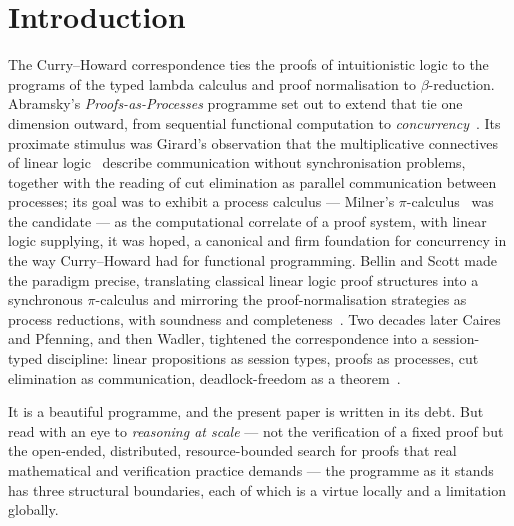 \documentclass[11pt]{article}
\theoremstyle{definition}
\theoremstyle{plain}
\begin{document}
\section{Introduction}

The Curry--Howard correspondence ties the proofs of intuitionistic logic to the
programs of the typed lambda calculus and proof normalisation to
$\beta$-reduction. Abramsky's \emph{Proofs-as-Processes} programme set out to
extend that tie one dimension outward, from sequential functional computation to
\emph{concurrency}~\cite{Abramsky93,Abramsky94}. Its proximate stimulus was
Girard's observation that the multiplicative connectives of linear
logic~\cite{Girard87} describe communication without synchronisation problems,
together with the reading of cut elimination as parallel communication between
processes; its goal was to exhibit a process calculus --- Milner's
$\pi$-calculus~\cite{MPW92} was the candidate --- as the computational correlate
of a proof system, with linear logic supplying, it was hoped, a canonical and
firm foundation for concurrency in the way Curry--Howard had for functional
programming. Bellin and Scott made the paradigm precise, translating classical
linear logic proof structures into a synchronous $\pi$-calculus and mirroring
the proof-normalisation strategies as process reductions, with soundness and
completeness~\cite{BellinScott94}. Two decades later Caires and Pfenning, and
then Wadler, tightened the correspondence into a session-typed discipline:
linear propositions as session types, proofs as processes, cut elimination as
communication, deadlock-freedom as a theorem~\cite{CairesPfenning10,Wadler14}.

It is a beautiful programme, and the present paper is written in its debt. But
read with an eye to \emph{reasoning at scale} --- not the verification of a
fixed proof but the open-ended, distributed, resource-bounded search for proofs
that real mathematical and verification practice demands --- the programme as it
stands has three structural boundaries, each of which is a virtue locally and a
limitation globally.
\end{document}
